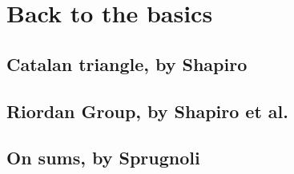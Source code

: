 
\chapter{Back to the basics}

\section{Catalan triangle, by Shapiro}


\section{Riordan Group, by Shapiro et al.}
\section{On sums, by Sprugnoli}

